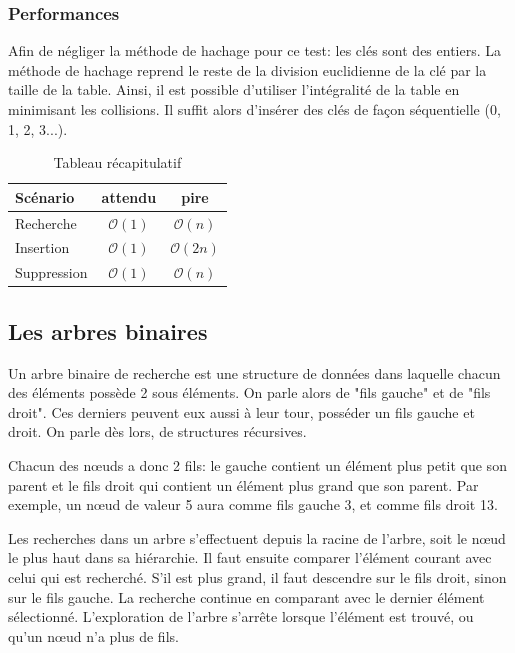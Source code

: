 \documentclass[hidelinks,a4paper, 12pt]{article}
\begin{document}
	\subsubsection*{Performances}
	
	Afin de négliger la méthode de hachage pour ce test: les clés sont des entiers. La méthode de hachage reprend le reste de la division euclidienne de la clé par la taille de la table. Ainsi, il est possible d'utiliser l'intégralité de la table en minimisant les collisions. Il suffit alors d'insérer des clés de façon séquentielle (0, 1, 2, 3...).
	
	 \begin{table}[h]
	 	\begin{tabular}{|l|c|c|}
	 		\hline
	 		Scénario & attendu & pire \\
	 		\hline
	 		Recherche & $\mathcal{O}(1)$ & $\mathcal{O}(n)$ \\ 
	 		\hline
	 		Insertion & $\mathcal{O}(1)$ & $\mathcal{O}(2n)$ \\
	 		\hline
	 		Suppression & $\mathcal{O}(1)$ & $\mathcal{O}(n)$\\
	 		\hline
	 	\end{tabular}
	 	\caption{Tableau récapitulatif}
	 \end{table}
	
	\newpage
	\subsection{Les arbres binaires}\label{BinaryTree}
	Un arbre binaire de recherche est une structure de données dans laquelle chacun des éléments possède 2 sous éléments. On parle alors de "fils gauche" et de "fils droit". Ces derniers peuvent eux aussi à leur tour, posséder un fils gauche et droit. On parle dès lors, de structures récursives.
	
	
	
	Chacun des nœuds a donc 2 fils: le gauche contient un élément plus petit que son parent et le fils droit qui contient un élément plus grand que son parent. Par exemple, un nœud de valeur 5 aura comme fils gauche 3, et comme fils droit 13.
	
	Les recherches dans un arbre s'effectuent depuis la racine de l'arbre, soit le nœud le plus haut dans sa hiérarchie. Il faut ensuite comparer l'élément courant avec celui qui est recherché. S'il est plus grand, il faut descendre sur le fils droit, sinon sur le fils gauche. La recherche continue en comparant avec le dernier élément sélectionné. L'exploration de l'arbre s'arrête lorsque l'élément est trouvé, ou qu'un nœud n'a plus de fils.
	
\end{document}
